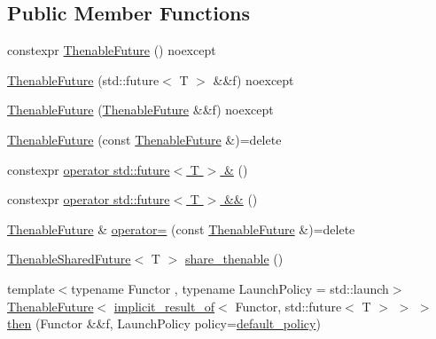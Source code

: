 \subsection*{Public Member Functions}
\begin{DoxyCompactItemize}
\item 
constexpr \hyperlink{classthenable_1_1_thenable_future_a0f196bb64cb0eef8413ecb9e3b399888}{Thenable\+Future} () noexcept
\item 
\hyperlink{classthenable_1_1_thenable_future_a2deca6d5d353e9f65cb14a0d39ab7918}{Thenable\+Future} (std\+::future$<$ T $>$ \&\&f) noexcept
\item 
\hyperlink{classthenable_1_1_thenable_future_afeb709673aa7f3d35dcdad52d4877204}{Thenable\+Future} (\hyperlink{classthenable_1_1_thenable_future}{Thenable\+Future} \&\&f) noexcept
\item 
\hyperlink{classthenable_1_1_thenable_future_a904bc02554b787135b30980d77229e93}{Thenable\+Future} (const \hyperlink{classthenable_1_1_thenable_future}{Thenable\+Future} \&)=delete
\item 
constexpr \hyperlink{classthenable_1_1_thenable_future_ab7fcb7739b5da68d1979138d577db382}{operator std\+::future$<$ T $>$ \&} ()
\item 
constexpr \hyperlink{classthenable_1_1_thenable_future_a6ee994e82bc2e8bb55417a7d3487e549}{operator std\+::future$<$ T $>$ \&\&} ()
\item 
\hyperlink{classthenable_1_1_thenable_future}{Thenable\+Future} \& \hyperlink{classthenable_1_1_thenable_future_a9f0a69b2fa5a4f63596ab4604ba6c028}{operator=} (const \hyperlink{classthenable_1_1_thenable_future}{Thenable\+Future} \&)=delete
\item 
\hyperlink{classthenable_1_1_thenable_shared_future}{Thenable\+Shared\+Future}$<$ T $>$ \hyperlink{classthenable_1_1_thenable_future_a2455963ef10abab0b99003a978cc547d}{share\+\_\+thenable} ()
\item 
{\footnotesize template$<$typename Functor , typename Launch\+Policy  = std\+::launch$>$ }\\\hyperlink{classthenable_1_1_thenable_future}{Thenable\+Future}$<$ \hyperlink{namespacethenable_a1ecf08d6ad8b8688d7b4df047b5feaae}{implicit\+\_\+result\+\_\+of}$<$ Functor, std\+::future$<$ T $>$ $>$ $>$ \hyperlink{classthenable_1_1_thenable_future_a6b284c9a8433018ee39906c0e4922dba}{then} (Functor \&\&f, Launch\+Policy policy=\hyperlink{namespacethenable_a55a20a452e9ba9c0eff946d9b8636f06}{default\+\_\+policy})
\end{DoxyCompactItemize}


